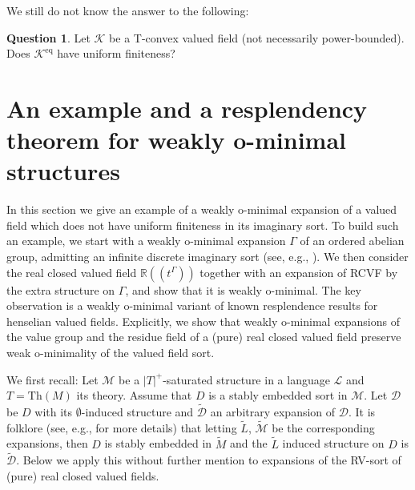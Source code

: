 \documentclass[11pt]{amsart}
\DeclareMathOperator{\eq}{eq}
\theoremstyle{definition}
\newtheorem{question}[theorem]{Question}
\newcommand{\CL}{{\mathcal L}}
\newcommand{\CK}{{\mathcal K}}
\newcommand{\CM}{{\mathcal M}}
\newcommand{\0}{\emptyset}
\begin{document}
We still do not know the answer to the following:
\begin{question}    
Let $\CK$ be a T-convex valued field (not necessarily power-bounded). Does $\CK^{\eq}$ have uniform finiteness?
\end{question}

\appendix

\section{An example and a  resplendency theorem for weakly o-minimal structures}
In this section we give an example of a weakly o-minimal expansion of a valued field which does not have uniform finiteness in its imaginary sort. To build such an example, we start with a weakly o-minimal expansion $\Gamma$ of an ordered abelian group, admitting an infinite discrete imaginary sort (see, e.g., \cite[Example A.6]{HaHaPeSs}). We then consider the real closed valued field $\mathbb R((t^\Gamma))$ together with an expansion of RCVF by the extra structure on $\Gamma$, and show that it is weakly o-minimal. The key observation is a weakly o-minimal variant of known resplendence results for henselian valued fields. Explicitly, we show that  weakly o-minimal expansions of the value group and the residue field of a (pure) real closed valued field preserve weak o-minimality of the valued field sort.  


We first recall: Let $\CM$ be a $|T|^+$-saturated structure in a language $\CL$ and $T=\mathrm{Th}(M)$ its theory. Assume that $D$ is a stably embedded sort in $\CM$. Let $\mathcal{D}$ be $D$ with its $\emptyset$-induced structure and $\widetilde{\mathcal{D}}$ an arbitrary expansion of $\mathcal{D}$. It is folklore (see, e.g., \cite[Proposition 2.7]{CodEHaJiRi} for more details)  that letting $\widetilde L$, $\widetilde{\CM}$  be the corresponding expansions, then $D$ is stably embedded in $\widetilde{M}$ and the $\widetilde{L}$ induced structure on $D$ is $\widetilde{\mathcal{D}}$. Below we apply this without further mention to expansions of the RV-sort of (pure) real closed valued fields. 
\end{document}
